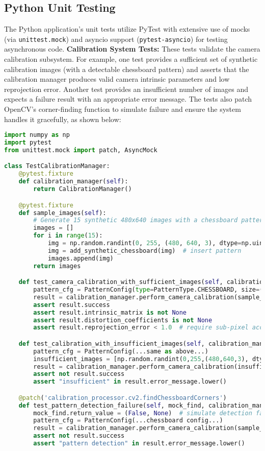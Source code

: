 \documentclass[11pt,a4paper]{report}
\begin{document}
\subsection{Python Unit Testing}
The Python application’s unit tests utilize PyTest with extensive use of mocks (via \texttt{unittest.mock}) and asyncio support (\texttt{pytest-asyncio}) for testing asynchronous code.
\textbf{Calibration System Tests:} These tests validate the camera calibration subsystem. For example, one test provides a sufficient set of synthetic calibration images (with a detectable chessboard pattern) and asserts that the calibration manager produces valid camera intrinsic parameters and low reprojection error. Another test provides an insufficient number of images and expects a failure result with an appropriate error message. The tests also patch OpenCV’s corner-finding function to simulate failure and ensure the system handles it gracefully, as shown below:
\begin{lstlisting}[language=Python]
import numpy as np
import pytest
from unittest.mock import patch, AsyncMock

class TestCalibrationManager:
    @pytest.fixture  
    def calibration_manager(self):  
        return CalibrationManager()

    @pytest.fixture  
    def sample_images(self):  
        # Generate 15 synthetic 480x640 images with a chessboard pattern  
        images = []  
        for i in range(15):  
            img = np.random.randint(0, 255, (480, 640, 3), dtype=np.uint8)  
            img = add_synthetic_chessboard(img)  # insert pattern  
            images.append(img)  
        return images  

    def test_camera_calibration_with_sufficient_images(self, calibration_manager, sample_images):  
        pattern_cfg = PatternConfig(type=PatternType.CHESSBOARD, size=(9,6), square_size=25.0)  
        result = calibration_manager.perform_camera_calibration(sample_images, pattern_cfg)  
        assert result.success  
        assert result.intrinsic_matrix is not None  
        assert result.distortion_coefficients is not None  
        assert result.reprojection_error < 1.0  # require sub-pixel accuracy  

    def test_calibration_with_insufficient_images(self, calibration_manager):  
        pattern_cfg = PatternConfig(...same as above...)  
        insufficient_images = [np.random.randint(0,255,(480,640,3), dtype=np.uint8) for _ in range(3)]  
        result = calibration_manager.perform_camera_calibration(insufficient_images, pattern_cfg)  
        assert not result.success  
        assert "insufficient" in result.error_message.lower()

    @patch('calibration_processor.cv2.findChessboardCorners')  
    def test_pattern_detection_failure(self, mock_find, calibration_manager, sample_images):  
        mock_find.return_value = (False, None)  # simulate detection failure  
        pattern_cfg = PatternConfig(...chessboard config...)  
        result = calibration_manager.perform_camera_calibration(sample_images, pattern_cfg)  
        assert not result.success  
        assert "pattern detection" in result.error_message.lower()  
\end{lstlisting}
\end{document}
